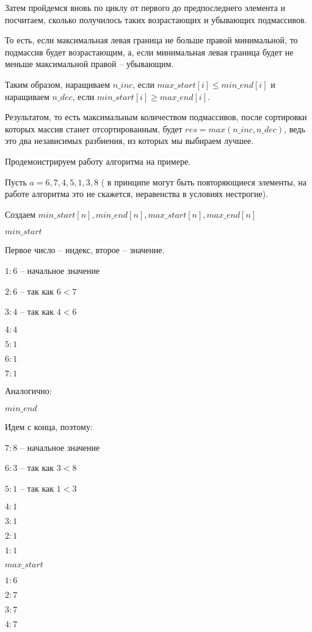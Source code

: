 \documentclass[12pt]{extreport}
\begin{document}
Затем пройдемся вновь по циклу от первого до предпоследнего элемента и посчитаем, сколько получилось таких возрастающих и убывающих подмассивов. 

То есть, если максимальная левая граница не больше правой минимальной, то подмассив будет возрастающим, а, если минимальная левая граница будет не меньше максимальной правой -- убывающим. 

Таким образом, наращиваем $n\_inc$, если $max\_start[i] \leq min\_end[i]$ и наращиваем $n\_dec$, если $min\_start[i] \geq max\_end[i]$. 

Результатом, то есть максимальным количеством подмассивов, после сортировки которых массив станет отсортированным, будет $res = max(n\_inc, n\_dec)$, ведь это два независимых разбиения, из которых мы выбираем лучшее. 

Продемонстрируем работу алгоритма на примере. 

Пусть $a = {6, 7, 4, 5, 1, 3, 8}$ ( в принципе могут быть повторяющиеся элементы, на работе алгоритма это не скажется, неравенства в условиях нестрогие).

Создаем $min\_start[n], min\_end[n], max\_start[n], max\_end[n]$

$min\_start$

Первое число -- индекс, второе -- значение.

$1: 6$ -- начальное значение

$2: 6$ -- так как $6<7$

$3: 4$ -- так как $4<6$

$4: 4$

$5: 1$

$6: 1$

$7: 1$

Аналогично: 

$min\_end$

Идем с конца, поэтому: 

$7: 8$ -- начальное значение

$6: 3$ -- так как $3<8$

$5: 1$ -- так как $1<3$

$4: 1$

$3: 1$

$2: 1$

$1: 1$

\bigskip

$max\_start$

$1: 6$ 

$2: 7$ 

$3: 7$ 

$4: 7$
\end{document}
